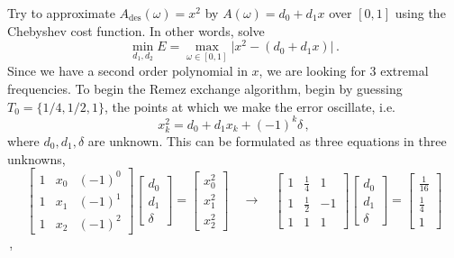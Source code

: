 \begin{exmp}
  Try to approximate $A_\mathrm{des}(\omega) = x^2$ by $A(\omega) = d_0 + d_1 x$
  over $[0,1]$ using the Chebyshev cost function. In other words, solve
  \begin{displaymath}
    \min_{d_1,d_2}E = \max_{\omega\in[0,1]}\lvert x^2 - (d_0 + d_1 x)\rvert \,.
  \end{displaymath}
  Since we have a second order polynomial in $x$, we are looking for 3 extremal
  frequencies. To begin the Remez exchange algorithm, begin by guessing
  $T_0 = \{1/4, 1/2, 1\}$, the points at which we make the error oscillate, i.e.
  \begin{displaymath}
    x_k^2 = d_0 + d_1x_k + (-1)^k\delta \,,
  \end{displaymath}
  where $d_0, d_1, \delta$ are unknown. This can be formulated as three equations
  in three unknowns,
  \begin{displaymath}
    \left[\begin{array}{ccc}
        1 & x_0 & (-1)^0 \\
        1 & x_1 & (-1)^1 \\
        1 & x_2 & (-1)^2
      \end{array}\right]
    \left[\begin{array}{c}d_0 \\ d_1 \\ \delta \end{array}\right]
    = \left[\begin{array}{c}x_0^2 \\ x_1^2 \\ x_2^2\end{array}\right]
  \quad\longrightarrow\quad
    \left[\begin{array}{ccc}
        1 & \frac{1}{4} & 1 \\
        1 & \frac{1}{2} & -1 \\
        1 & 1 & 1
      \end{array}\right]
    \left[\begin{array}{c}d_0 \\ d_1 \\ \delta \end{array}\right]
    = \left[\begin{array}{c}\frac{1}{16} \\ \frac{1}{4} \\ 1\end{array}\right]  
  \end{displaymath} \,,

\end{exmp}
